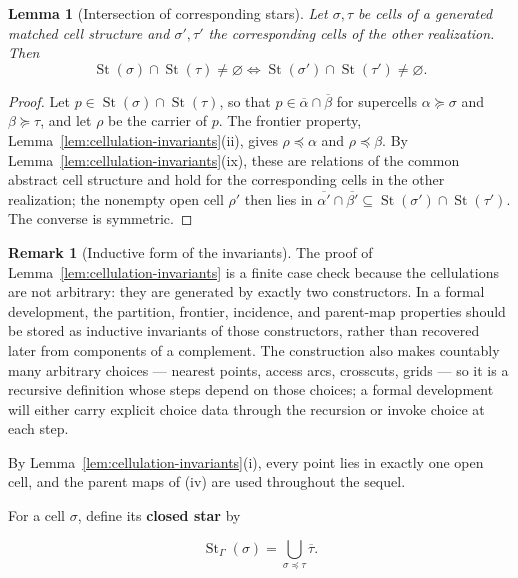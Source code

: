 \documentclass[11pt]{article}
\theoremstyle{mainplain}
\newtheorem{lemma}[theorem]{Lemma}
\theoremstyle{mainroman}
\theoremstyle{definition}
\newtheorem{remark}[theorem]{Remark}
\numberwithin{equation}{section}
\begin{document}
\begin{lemma}[Intersection of corresponding stars]\label{lem:star-intersection}
Let \(\sigma,\tau\) be cells of a generated matched cell structure and
\(\sigma',\tau'\) the corresponding cells of the other realization.
Then
\[
 \operatorname{St}(\sigma)\cap\operatorname{St}(\tau)\ne\varnothing
 \iff
 \operatorname{St}(\sigma')\cap\operatorname{St}(\tau')\ne\varnothing .
\]
\end{lemma}
\begin{proof}
Let \(p\in\operatorname{St}(\sigma)\cap\operatorname{St}(\tau)\), so
that \(p\in\overline\alpha\cap\overline\beta\) for supercells
\(\alpha\succeq\sigma\) and \(\beta\succeq\tau\), and let \(\rho\) be
the carrier of \(p\). The frontier property,
Lemma~\ref{lem:cellulation-invariants}\textup{(ii)}, gives
\(\rho\preceq\alpha\) and \(\rho\preceq\beta\). By
Lemma~\ref{lem:cellulation-invariants}\textup{(ix)}, these are
relations of the common abstract cell structure and hold for the
corresponding cells in the other realization; the nonempty open cell \(\rho'\) then lies in
\(\overline{\alpha'}\cap\overline{\beta'}
\subseteq\operatorname{St}(\sigma')\cap\operatorname{St}(\tau')\).
The converse is symmetric.
\end{proof}

\begin{remark}[Inductive form of the invariants]\label{rem:inductive-invariants}
The proof of Lemma~\ref{lem:cellulation-invariants} is a finite case
check because the cellulations are
not arbitrary: they are generated by exactly two constructors. In a
formal development, the partition, frontier, incidence, and parent-map
properties should be stored as inductive invariants of those constructors,
rather than recovered later from components of a complement. The
construction also makes countably many arbitrary choices --- nearest
points, access arcs, crosscuts, grids --- so it is a recursive
definition whose steps depend on those choices; a formal development
will either carry explicit choice data through the recursion or invoke
choice at each step.
\end{remark}

By Lemma~\ref{lem:cellulation-invariants}\textup{(i)}, every point
lies in exactly one open cell, and the parent maps of
\textup{(iv)} are used throughout the sequel.

For a cell \(\sigma\), define its \textbf{closed star} by

\[
\operatorname{St}_{\Gamma}(\sigma)
 =
 \bigcup_{\sigma\preceq\tau}\overline\tau.
\]
\end{document}
